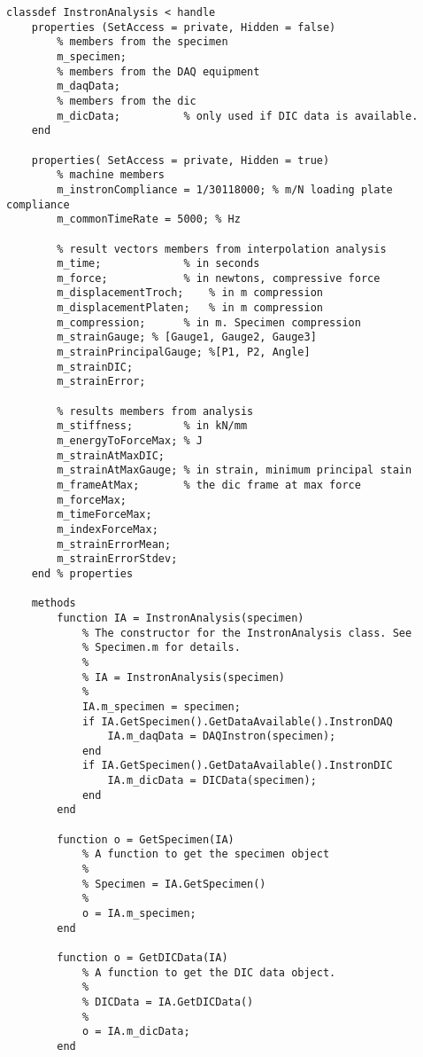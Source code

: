 \begin{lstlisting}
classdef InstronAnalysis < handle
    properties (SetAccess = private, Hidden = false)
        % members from the specimen
        m_specimen;
        % members from the DAQ equipment
        m_daqData;
        % members from the dic
        m_dicData;          % only used if DIC data is available.
    end
    
    properties( SetAccess = private, Hidden = true)    
        % machine members
        m_instronCompliance = 1/30118000; % m/N loading plate compliance
        m_commonTimeRate = 5000; % Hz
        
        % result vectors members from interpolation analysis
        m_time;             % in seconds
        m_force;            % in newtons, compressive force
        m_displacementTroch;    % in m compression
        m_displacementPlaten;   % in m compression
        m_compression;      % in m. Specimen compression
        m_strainGauge; % [Gauge1, Gauge2, Gauge3]
        m_strainPrincipalGauge; %[P1, P2, Angle]
        m_strainDIC;
        m_strainError;
        
        % results members from analysis
        m_stiffness;        % in kN/mm
        m_energyToForceMax; % J
        m_strainAtMaxDIC;
        m_strainAtMaxGauge; % in strain, minimum principal stain
        m_frameAtMax;       % the dic frame at max force
        m_forceMax;
        m_timeForceMax;
        m_indexForceMax;
        m_strainErrorMean;
        m_strainErrorStdev;
    end % properties
    
    methods
        function IA = InstronAnalysis(specimen)
            % The constructor for the InstronAnalysis class. See
            % Specimen.m for details.
            %
            % IA = InstronAnalysis(specimen)
            %
            IA.m_specimen = specimen;
            if IA.GetSpecimen().GetDataAvailable().InstronDAQ
                IA.m_daqData = DAQInstron(specimen);
            end
            if IA.GetSpecimen().GetDataAvailable().InstronDIC
                IA.m_dicData = DICData(specimen);
            end
        end

        function o = GetSpecimen(IA)
            % A function to get the specimen object
            %
            % Specimen = IA.GetSpecimen()
            %
            o = IA.m_specimen;
        end

        function o = GetDICData(IA)
            % A function to get the DIC data object.
            %
            % DICData = IA.GetDICData()
            %
            o = IA.m_dicData;
        end


\end{lstlisting}
